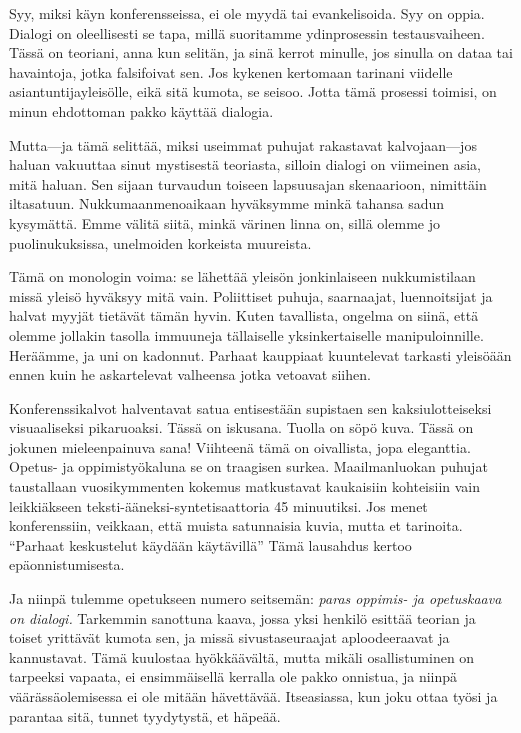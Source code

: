 Syy, miksi käyn konferensseissa, ei ole myydä tai evankelisoida. Syy on oppia. Dialogi on oleellisesti se tapa, millä suoritamme ydinprosessin testausvaiheen. Tässä on teoriani, anna kun selitän, ja sinä kerrot minulle, jos sinulla on dataa tai havaintoja, jotka falsifoivat sen. Jos kykenen kertomaan tarinani viidelle asiantuntijayleisölle, eikä sitä kumota, se seisoo. Jotta tämä prosessi toimisi, on minun ehdottoman pakko käyttää dialogia.

Mutta---ja tämä selittää, miksi useimmat puhujat rakastavat kalvojaan---jos haluan vakuuttaa sinut mystisestä teoriasta, silloin dialogi on viimeinen asia, mitä haluan. Sen sijaan turvaudun toiseen lapsuusajan skenaarioon, nimittäin iltasatuun. Nukkumaanmenoaikaan hyväksymme minkä tahansa sadun kysymättä. Emme välitä siitä, minkä värinen linna on, sillä olemme jo puolinukuksissa, unelmoiden korkeista muureista.

Tämä on monologin voima: se lähettää yleisön jonkinlaiseen nukkumistilaan missä yleisö hyväksyy mitä vain. Poliittiset puhuja, saarnaajat, luennoitsijat ja halvat myyjät tietävät tämän hyvin. Kuten tavallista, ongelma on siinä, että olemme jollakin tasolla immuuneja tällaiselle yksinkertaiselle manipuloinnille. Heräämme, ja uni on kadonnut. Parhaat kauppiaat kuuntelevat tarkasti yleisöään ennen kuin he askartelevat valheensa jotka vetoavat siihen.

Konferenssikalvot halventavat satua entisestään supistaen sen kaksiulotteiseksi visuaaliseksi pikaruoaksi. Tässä on iskusana. Tuolla on söpö kuva. Tässä on jokunen mieleenpainuva sana! Viihteenä tämä on oivallista, jopa eleganttia. Opetus- ja oppimistyökaluna se on traagisen surkea. Maailmanluokan puhujat taustallaan vuosikymmenten kokemus matkustavat kaukaisiin kohteisiin vain leikkiäkseen teksti-ääneksi-syntetisaattoria 45 minuutiksi. Jos menet konferenssiin, veikkaan, että muista satunnaisia kuvia, mutta et tarinoita. ``Parhaat keskustelut käydään käytävillä'' Tämä lausahdus kertoo epäonnistumisesta.

Ja niinpä tulemme opetukseen numero seitsemän: \emph{paras oppimis- ja opetuskaava on dialogi.} Tarkemmin sanottuna kaava, jossa yksi henkilö esittää teorian ja toiset yrittävät kumota sen, ja missä sivustaseuraajat aploodeeraavat ja kannustavat. Tämä kuulostaa hyökkäävältä, mutta mikäli osallistuminen on tarpeeksi vapaata, ei ensimmäisellä kerralla ole pakko onnistua, ja niinpä väärässäolemisessa ei ole mitään hävettävää. Itseasiassa, kun joku ottaa työsi ja parantaa sitä, tunnet tyydytystä, et häpeää.

